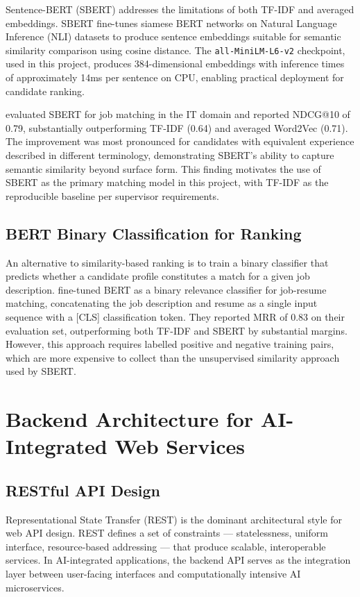 Sentence-BERT (SBERT) \citep{Reimers2019} addresses the limitations of both TF-IDF and averaged embeddings. SBERT fine-tunes siamese BERT networks on Natural Language Inference (NLI) datasets to produce sentence embeddings suitable for semantic similarity comparison using cosine distance. The \texttt{all-MiniLM-L6-v2} checkpoint, used in this project, produces 384-dimensional embeddings with inference times of approximately 14ms per sentence on CPU, enabling practical deployment for candidate ranking.

\citet{Qin2021} evaluated SBERT for job matching in the IT domain and reported NDCG@10 of 0.79, substantially outperforming TF-IDF (0.64) and averaged Word2Vec (0.71). The improvement was most pronounced for candidates with equivalent experience described in different terminology, demonstrating SBERT's ability to capture semantic similarity beyond surface form. This finding motivates the use of SBERT as the primary matching model in this project, with TF-IDF as the reproducible baseline per supervisor requirements.

\subsection{BERT Binary Classification for Ranking}

An alternative to similarity-based ranking is to train a binary classifier that predicts whether a candidate profile constitutes a match for a given job description. \citet{Peng2019} fine-tuned BERT as a binary relevance classifier for job-resume matching, concatenating the job description and resume as a single input sequence with a [CLS] classification token. They reported MRR of 0.83 on their evaluation set, outperforming both TF-IDF and SBERT by substantial margins. However, this approach requires labelled positive and negative training pairs, which are more expensive to collect than the unsupervised similarity approach used by SBERT.

\section{Backend Architecture for AI-Integrated Web Services}
\label{sec:backend}

\subsection{RESTful API Design}

Representational State Transfer (REST) \citep{Fielding2000} is the dominant architectural style for web API design. REST defines a set of constraints --- statelessness, uniform interface, resource-based addressing --- that produce scalable, interoperable services. In AI-integrated applications, the backend API serves as the integration layer between user-facing interfaces and computationally intensive AI microservices.

